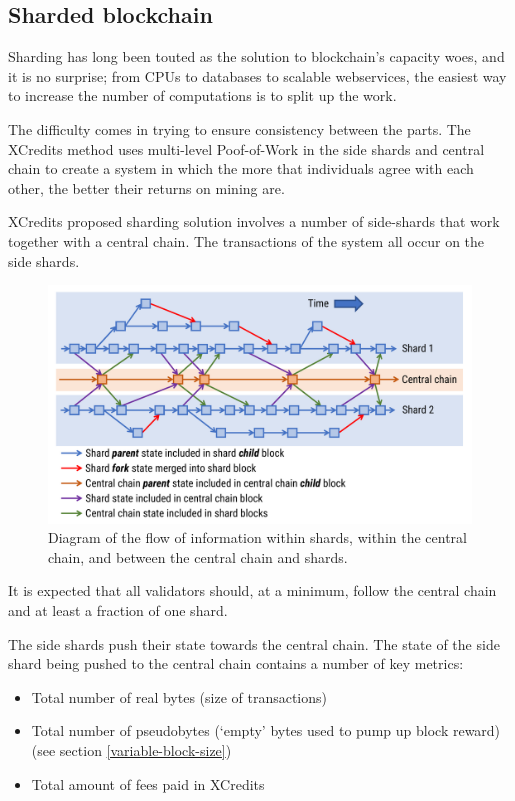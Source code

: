 \documentclass[a4paper,12pt]{article}
\begin{document}
\subsection{Sharded blockchain}
Sharding has long been touted as the solution to blockchain's capacity woes, and it is no surprise; from CPUs to databases to scalable webservices, the easiest way to increase the number of computations is to split up the work.

The difficulty comes in trying to ensure consistency between the parts. The XCredits method uses multi-level Poof-of-Work in the side shards and central chain to create a system in which the more that individuals agree with each other, the better their returns on mining are. 

XCredits proposed sharding solution involves a number of side-shards that work together with a central chain. The transactions of the system all occur on the side shards.

\begin{figure}[!htb]
  \centering
  \includegraphics[page=1,width=.95\textwidth]{shard-central-chain} 
  \caption{Diagram of the flow of information within shards, within the central chain, and between the central chain and shards.}
  \label{fig:shard-central-chain}
\end{figure}
\FloatBarrier

It is expected that all validators should, at a minimum, follow the central chain and at least a fraction of one shard. 

The side shards push their state towards the central chain. The state of the side shard being pushed to the central chain contains a number of key metrics:
\begin{itemize}
  \item Total number of real bytes (size of transactions)
  \item Total number of pseudobytes (`empty' bytes used to pump up block reward) (see section \ref{variable-block-size})
  \item Total amount of fees paid in XCredits
\end{itemize}
\end{document}
